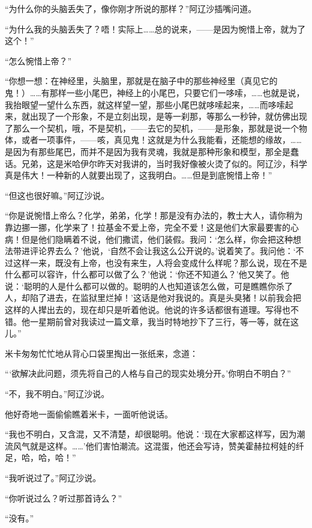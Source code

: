 \par “为什么你的头脑丢失了，像你刚才所说的那样？”阿辽沙插嘴问道。
\par “为什么我的头脑丢失了？唔！实际上……总的说来，——是因为惋惜上帝，就为了这个！”
\par “怎么惋惜上帝？”
\par “你想一想：在神经里，头脑里，那就是在脑子中的那些神经里（真见它的鬼！）……有那样一些小尾巴，神经上的小尾巴，只要它们一哆嗦，……也就是说，我抬眼望一望什么东西，就这样望一望，那些小尾巴就哆嗦起来，……而哆嗦起来，就出现了一个形象，不是立刻出现，是等一刹那，等那么一秒钟，就仿佛出现了那么一个契机，哦，不是契机，——去它的契机，——是形象，那就是说一个物体，或者一项事件，——咳，真见鬼！这就是为什么我能看，还能想的缘故，……是因为有那些尾巴，而并不是因为我有灵魂，我就是那种形象和模型，那全是蠢话。兄弟，这是米哈伊尔昨天对我讲的，当时我好像被火烫了似的。阿辽沙，科学真是伟大！一种新的人就要出现了，这我明白。……但是到底惋惜上帝！”
\par “但这也很好嘛。”阿辽沙说。
\par “你是说惋惜上帝么？化学，弟弟，化学！那是没有办法的，教士大人，请你稍为靠边挪一挪，化学来了！拉基金不爱上帝，完全不爱！这是他们大家最要害的心病！但是他们隐瞒着不说，他们撒谎，他们装假。我问：‘怎么样，你会把这种想法带进评论界去么？’他说，‘自然不会让我这么公开说的。’说着笑了。我问他：‘不过这样一来，既没有上帝，也没有来生，人将会变成什么样呢？那么说，现在不是什么都可以容许，什么都可以做了么？’他说：‘你还不知道么？’他又笑了。他说：‘聪明的人是什么都可以做的。聪明的人也知道该怎么做，可是瞧瞧你杀了人，却陷了进去，在监狱里烂掉！’这话是他对我说的。真是头臭猪！以前我会把这样的人撵出去的，现在却只是听着他说。他说的许多话都很有道理。写得也不错。他一星期前曾对我读过一篇文章，我当时特地抄下了三行，等一等，就在这儿。”
\par 米卡匆匆忙忙地从背心口袋里掏出一张纸来，念道：
\par “‘欲解决此问题，须先将自己的人格与自己的现实处境分开。’你明白不明白？”
\par “不，我不明白。”阿辽沙说。
\par 他好奇地一面偷偷瞧着米卡，一面听他说话。
\par “我也不明白，又含混，又不清楚，却很聪明。他说：‘现在大家都这样写，因为潮流风气就是这样。……’他们害怕潮流。这混蛋，他还会写诗，赞美霍赫拉柯娃的纤足，哈，哈，哈！”
\par “我听说过了。”阿辽沙说。
\par “你听说过么？听过那首诗么？”
\par “没有。”

